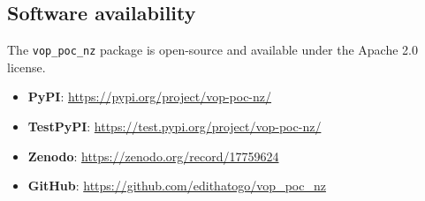 \documentclass[article]{jss}
\newcommand{\pkg}[1]{\texttt{#1}}
\begin{document}
\subsection{Software availability}
The \pkg{vop\_poc\_nz} package is open-source and available under the Apache 2.0 license.
\begin{itemize}
    \item \textbf{PyPI}: \url{https://pypi.org/project/vop-poc-nz/}
    \item \textbf{TestPyPI}: \url{https://test.pypi.org/project/vop-poc-nz/}
    \item \textbf{Zenodo}: \url{https://zenodo.org/record/17759624}
    \item \textbf{GitHub}: \url{https://github.com/edithatogo/vop_poc_nz}
\end{itemize}

\ifdefined\JSSMODE
\else
  
\fi

\end{document}
